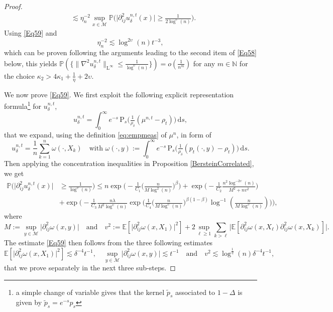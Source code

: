 \documentclass[11pt,a4paper,oneside]{amsart}
\numberwithin{equation}{section}
\renewcommand{\P}{{\mathbb P}}
\newcommand{\dd}{\mathrm{d}}
\newcommand{\LL}{\mathrm{L}}
\begin{document}
\begin{proof}
\begin{align*}
&\lesssim \eta^{-2}_{n}\sup_{x\in\mathcal{M}}\mathbb{P}\Big(\vert\partial^2_{ij} u^{n,t}_{\delta}(x)\vert\geq \tfrac{1}{2\log^{\upsilon}(n)}\Big).
\end{align*}
%
Using \eqref{Eq59} and 
%
$$\eta^{-2}_n\lesssim \log^{2\upsilon}(n)t^{-3},$$
%
which can be proven following the arguments leading to the second item of \eqref{Eq58} below, this yields $\P(\{\|\nabla^2 u^{n,t}_\delta\|_{\LL^{\infty}}\leq \tfrac{1}{\log^{\upsilon}(n)}\})=o(\tfrac{1}{n^m})$ for any $m\in\mathbb{N}$ for the choice $\kappa_2>4\kappa_1+\frac{1}{\eta}+2\upsilon$.
%
%
\medskip
%

We now prove \eqref{Eq59}. We first exploit the following explicit representation formula\footnote{a simple change of variable gives that the kernel $\tilde{p}_s$ associated to $1-\Delta$ is given by $\tilde{p}_s=e^{-s}p_s$} for $u^{n,t}_{\delta}$, 
%
\begin{equation}\label{eq:stella3}
u^{n,t}_{\delta}=\int_0^{\infty}e^{-s}\,\text{P}_s\Big(\tfrac{1}{\rho_\delta}(\mu^{n,t}-\rho_t)\Big)\,\dd s,
\end{equation}
%
that we expand, using the definition \eqref{eq:empmeas} of $\mu^{n}$, in form of
%
\begin{equation}\label{eq:stella}
u^{n,t}_{\delta}=\frac{1}{n}\sum_{k=1}^n\omega(\cdot,X_k)\quad\text{with } \omega(\cdot,y):=\int_{0}^{\infty}e^{-s}\,\text{P}_s\Big(\tfrac{1}{\rho_{\delta}}(p_t(\cdot,y)-\rho_t)\Big)\,\dd s.
\end{equation}
%
Then applying the concentration inequalities in Proposition \ref{BersteinCorrelated}, we get 
%
\begin{equation}\label{eq:stella2}
\begin{split}
\mathbb{P}\Big(\vert\partial^2_{ij} u^{n,t}_{\delta}(x)\vert &\geq \tfrac{1}{\log^{\upsilon}(n)}\Big)\leq n\exp\bigg(-\frac{1}{C_1}\Big(\frac{n}{M\log^{2}(n)}\Big)^{\beta}\bigg)+\exp\bigg(-\frac{1}{C_2}\frac{n^2\log^{-2\upsilon}(n)}{M^2+n v^2}\bigg)\\
&+\exp\bigg(-\frac{1}{C_3}\frac{n\lambda}{M^2\log^{\upsilon}(n)}\exp\Big(\frac{1}{C_4}\Big(\frac{n}{M\log^{\upsilon}(n)}\Big)^{\beta(1-\beta)}\log^{-1}(\tfrac{n}{M\log^{\upsilon}(n)})\Big)\bigg),
\end{split}
\end{equation}
%
where 
%
\begin{equation}\label{Eq79}
M:=\sup_{y\in\mathcal{M}}\vert\partial^2_{ij}\omega(x,y)\vert\quad\text{and}\quad v^2:=\mathbb{E}[\vert\partial^2_{ij}\omega(x,X_1)\vert^2]+2\sup_{\ell\geq 1}\sum_{k>\ell}\vert\mathbb{E}[\partial^2_{ij}\omega(x,X_\ell)\partial^2_{ij}\omega(x,X_k)]\vert.
\end{equation}
%
The estimate \eqref{Eq59} then follows from the three following estimates
%
\begin{equation}\label{Eq58}
\mathbb{E}[\vert\partial^2_{ij} \omega(x,X_1)\vert^2]\lesssim \delta^{-4}t^{-1},\quad \sup_{y\in\mathcal{M}}\vert\partial^2_{ij} \omega(x,y)\vert\lesssim t^{-1}\quad\text{and}\quad v^2\lesssim \log^{\frac{1}{\eta}}(n)\delta^{-4}t^{-1} ,
\end{equation}
%
that we prove separately in the next three sub-steps.


\end{proof}
\end{document}
